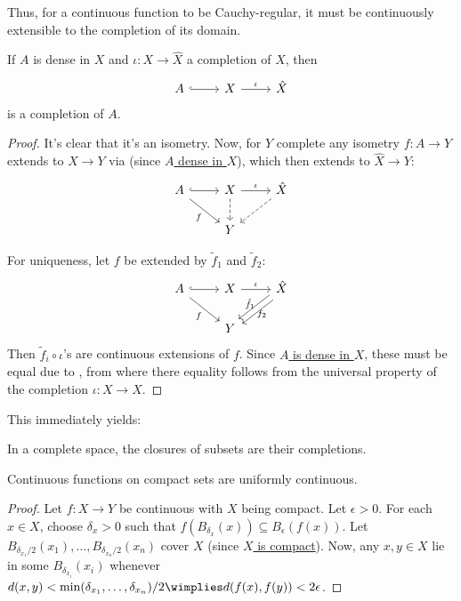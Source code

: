 	Thus, for a continuous function to be Cauchy-regular, it must be continuously extensible to the completion of its domain.
	
	\begin{cor}\label{COR: completion via denseness}
		If $A$ is dense in $X$ and $\iota\colon X\to \hat X$ a completion of $X$, then
		\[
		\begin{tikzcd}
			A\ar[r, hook] & X\ar[r, "\iota"] & \hat X
		\end{tikzcd}
		\]
		is a completion of $A$.
	\end{cor}
	
	\begin{proof}
		It's clear that it's an isometry. Now, for $Y$ complete any isometry $f\colon A\to Y$ extends to $X\to Y$ via  (since \uline{$A$ dense in $X$}), which then extends to $\hat X\to Y$:
		\[
		\begin{tikzcd}
			A\ar[r, hook]\ar[dr, "f"'] & X\ar[r, "\iota"]\ar[d, dashed] & \hat X\ar[dl, dashed]\\
			& Y &
		\end{tikzcd}
		\]
		
		For uniqueness, let $f$ be extended by $\tilde f_1$ and $\tilde f_2$:
		\[
		\begin{tikzcd}
			A\ar[r, hook]\ar[dr, "f"'] & X\ar[r, "\iota"] & \hat X\ar[dl, shift left, "\tilde f_1"']\ar[dl, shift right, "f_2"]\\
			& Y &
		\end{tikzcd}
		\]
		Then $\tilde f_i\circ \iota$'s are continuous extensions of $f$. Since \uline{$A$ is dense in $X$}, these must be equal due to , from where there equality follows from the universal property of the completion $\iota\colon X\to\hat X$.
	\end{proof}
	
	\noindent This immediately yields:
	
	\begin{cor}
		In a complete space, the closures of subsets are their completions.
	\end{cor}
	
	

	\begin{prp}\label{PRP: cont funcs on compact are unif cont}
		Continuous functions on compact sets are uniformly continuous.
	\end{prp}
	
	\begin{proof}
		Let $f\colon X\to Y$ be continuous with $X$ being compact. Let $\epsilon > 0$. For each $x\in X$, choose $\delta_x > 0$ such that $f(B_{\delta_x}(x))\subseteq B_\epsilon(f(x))$.
		Let $B_{\delta_{x_1}/2}(x_1), \ldots, B_{\delta_{x_n}/2}(x_n)$ cover $X$ (since \uline{$X$ is compact}). Now, any $x, y\in X$ lie in some $B_{\delta_{x_i}}(x_i)$ whenever $d(x, y) < \min(\delta_{x_1}, \ldots, \delta_{x_n})/2\wimplies d(f(x), f(y)) < 2\epsilon$.
	\end{proof}
	
